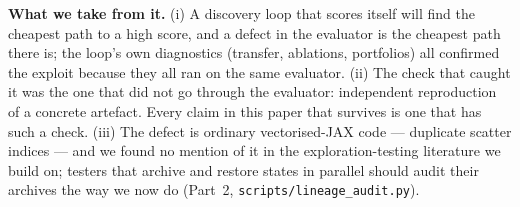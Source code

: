 \textbf{What we take from it.} (i) A discovery loop that scores itself will find the cheapest path to a high score, and a
defect in the evaluator is the cheapest path there is; the loop's own diagnostics (transfer, ablations, portfolios) all
confirmed the exploit because they all ran on the same evaluator. (ii) The check that caught it was the one that did not
go through the evaluator: independent reproduction of a concrete artefact. Every claim in this paper that survives is one
that has such a check. (iii) The defect is ordinary vectorised-JAX code --- duplicate scatter indices --- and we found no
mention of it in the exploration-testing literature we build on; testers that archive and restore states in parallel
should audit their archives the way we now do (Part~2, \texttt{scripts/lineage\_audit.py}).
